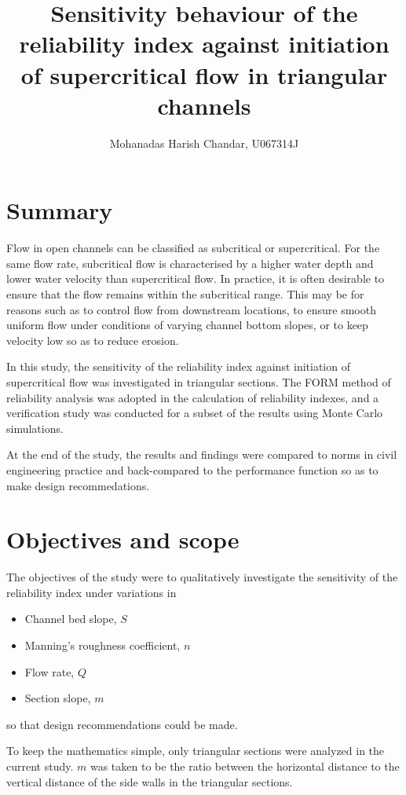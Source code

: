 \documentclass[a4paper]{article}
\title{Sensitivity behaviour of the reliability index against initiation of 
       supercritical flow in triangular channels
      }
\author{Mohanadas Harish Chandar, U067314J}
\begin{document}
\maketitle

\section{Summary}
Flow in open channels can be classified as subcritical or supercritical.
For the same flow rate, subcritical flow is characterised by a higher water 
depth and lower water velocity than supercritical flow.
In practice, it is often desirable to ensure that the flow remains within the 
subcritical range. This may be for reasons such as to control flow
from downstream locations, to ensure smooth uniform flow under conditions
of varying channel bottom slopes, or to keep velocity low so as to reduce
erosion.

In this study, the sensitivity of the reliability index against
initiation of supercritical flow was investigated in triangular sections.
The FORM method of reliability analysis was adopted in the calculation
of reliability indexes, and a verification study was conducted 
for a subset of the results using Monte Carlo simulations.

At the end of the study, the results and findings were compared to 
norms in civil engineering practice and back-compared to the performance function
so as to make design recommedations.

\section{Objectives and scope}
The objectives of the study were to qualitatively investigate the 
sensitivity of the reliability index under variations in

\begin{itemize}
\item Channel bed slope, $S$
\item Manning's roughness coefficient, $n$
\item Flow rate, $Q$
\item Section slope, $m$
\end{itemize}

so that design recommendations could be made.

To keep the mathematics simple, only triangular sections were analyzed in the 
current study. $m$ was taken to be the ratio between the horizontal distance to
the vertical distance of the side walls in the triangular sections.
\end{document}
